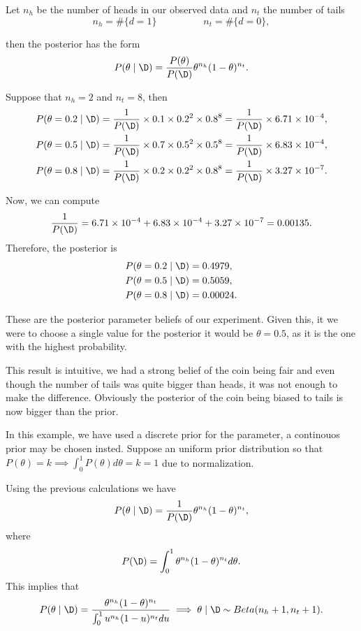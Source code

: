 \begin{exampleth}
Let \(n_h\) be the number of heads in our observed data and \(n_t\)
the number of tails
\[
  n_{h} = \#\{d= 1\} \hspace{2cm} n_{t} = \#\{d = 0\},
\]

then the posterior has the form
\[
  P(\theta  \mid \D) = \frac{P(\theta)}{P(\D)} \theta^{n_h}(1-\theta)^{n_t}.
\]

Suppose that \(n_h = 2\) and \(n_t = 8\), then
\[
\begin{aligned}
  P(\theta = 0.2  \mid  \D) &= \frac{1}{P(\D)}\times 0.1 \times 0.2^{2}
  \times 0.8^{8} = \frac{1}{P(\D)} \times 6.71\times10^{-4}, \\
   P(\theta = 0.5  \mid  \D) &= \frac{1}{P(\D)}\times 0.7 \times 0.5^{2}
   \times 0.5^{8} = \frac{1}{P(\D)} \times 6.83\times10^{-4},\\
    P(\theta = 0.8  \mid  \D) &= \frac{1}{P(\D)}\times 0.2 \times 0.2^{2}
  \times 0.8^{8} = \frac{1}{P(\D)} \times 3.27\times10^{-7}.
\end{aligned}
\]

Now, we can compute
\[
   \frac{1}{P(\D)} =  6.71\times10^{-4} +   6.83\times10^{-4} +
   3.27\times10^{-7} = 0.00135.
 \]
Therefore, the posterior is
\[
\begin{aligned}
  P(\theta = 0.2  \mid  \D) &= 0.4979,\\
  P(\theta = 0.5  \mid  \D) &= 0.5059,\\
  P(\theta = 0.8  \mid  \D) &= 0.00024.
\end{aligned}
\]

These are the posterior parameter beliefs of our experiment. Given this, it we
were to choose a single value for the posterior it would be \(\theta = 0.5\), as it is the one with the highest probability.

This result is intuitive, we had a strong belief of the coin being fair
and even though the number of tails was quite bigger than heads, it
was not enough to make the difference. Obviously the posterior of the coin being
biased to tails is now bigger than the prior.

In this example, we have used a discrete prior for the parameter, a continouos prior may be chosen insted. Suppose an uniform prior distribution so that \(P(\theta) = k \implies \int_0^1 P(\theta) d\theta
= k = 1\) due to normalization.

Using the previous calculations we have
\[
  P(\theta \mid  \D) = \frac{1}{P(\D)} \theta^{n_h}(1-\theta)^{n_t},
\]
where
\[
  P(\D) = \int_0^1 \theta^{n_h}(1-\theta)^{n_t} d\theta.
\]
This implies that
\[
  P(\theta \mid \D) = \frac{\theta^{n_h}(1-\theta)^{n_t} }{ \int_0^1 u^{n_h}(1-u)^{n_t} du} \implies \theta \mid \D \sim Beta(n_h + 1, n_t + 1).
\]
\end{exampleth}

